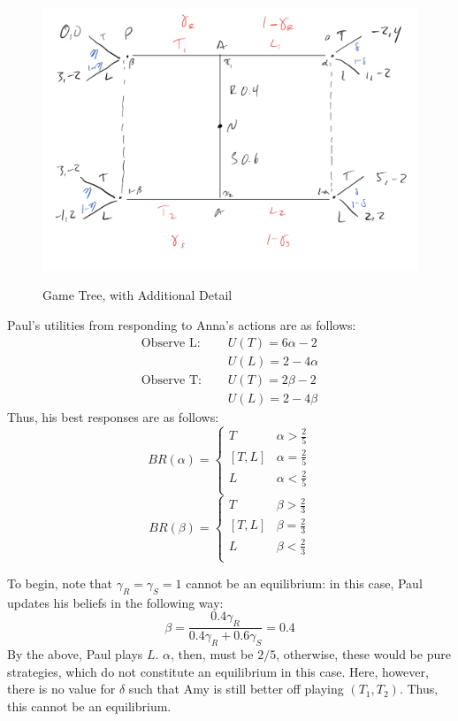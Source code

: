 \documentclass[11pt]{article}
\begin{document}
\begin{enumerate}
	\begin{figure}[!h]
		\centering
		\caption{Game Tree, with Additional Detail}
		\includegraphics[scale=0.6]{fig_4_tree_color}
		\label{fig4}
	\end{figure}
	
	Paul's utilities from responding to Anna's actions are as follows:
	\begin{align*}
	\text{Observe L: }\quad &U(T) = 6\alpha - 2 \\
	& U(L) = 2 - 4\alpha \\
	\text{Observe T: } \quad &U(T) = 2\beta - 2 \\
	&U(L) = 2 - 4\beta
	\end{align*}
	Thus, his best responses are as follows: 
	\[BR(\alpha) = \begin{cases}
	T & \alpha > \frac{2}{5} \\
	[T,L] & \alpha = \frac{2}{5} \\
	L & \alpha < \frac{2}{5} \\
	\end{cases} \]%
	\[BR(\beta) = \begin{cases}
	T & \beta > \frac{2}{3} \\
	[T,L] & \beta = \frac{2}{3} \\
	L & \beta < \frac{2}{3} \\
	\end{cases} \]
	
	To begin, note that $ \gamma_R = \gamma_S = 1 $ cannot be an equilibrium: in this case, Paul updates his beliefs in the following way: 
	\[\beta = \frac{0.4\gamma_R}{0.4\gamma_R + 0.6\gamma_S} = 0.4\]
	By the above, Paul plays $ L $. $\alpha$, then, must be $ 2/5 $, otherwise, these would be pure strategies, which do not constitute an equilibrium in this case. Here, however, there is no value for $\delta$ such that Amy is still better off playing $ (T_1, T_2) $. Thus, this cannot be an equilibrium.
	

\end{enumerate}
\end{document}
